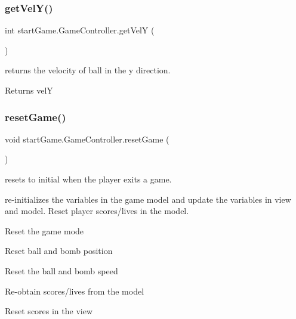 \subsubsection{\texorpdfstring{get\+Vel\+Y()}{getVelY()}}
{\footnotesize\ttfamily int start\+Game.\+Game\+Controller.\+get\+VelY (\begin{DoxyParamCaption}{ }\end{DoxyParamCaption})}



returns the velocity of ball in the y direction. 

\begin{DoxyReturn}{Returns}
velY 
\end{DoxyReturn}
\hypertarget{classstart_game_1_1_game_controller_a2248f03e8a73083a57b10d4faec5797c}{}\label{classstart_game_1_1_game_controller_a2248f03e8a73083a57b10d4faec5797c} 
\subsubsection{\texorpdfstring{reset\+Game()}{resetGame()}}
{\footnotesize\ttfamily void start\+Game.\+Game\+Controller.\+reset\+Game (\begin{DoxyParamCaption}{ }\end{DoxyParamCaption})\hspace{0.3cm}{\ttfamily [private]}}



resets to initial when the player exits a game. 

re-\/initializes the variables in the game model and update the variables in view and model. Reset player scores/lives in the model.

Reset the game mode

Reset ball and bomb position

Reset the ball and bomb speed

Re-\/obtain scores/lives from the model

Reset scores in the view\hypertarget{classstart_game_1_1_game_controller_a115fe144ac38f1b8d7e6be4d5bbb23f4}{}\label{classstart_game_1_1_game_controller_a115fe144ac38f1b8d7e6be4d5bbb23f4} 
